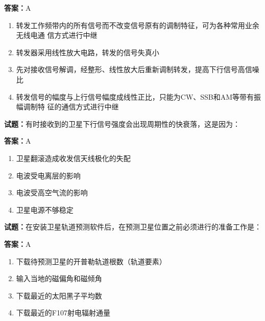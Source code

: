 \documentclass{ctexbook}
\begin{document}
\textbf{答案：}A 

\begin{enumerate}[leftmargin=3em]
  \item 转发工作频带内的所有信号而不改变信号原有的调制特征，可为各种常用业余无线电通
信方式进行中继 

  \item 转发器采用线性放大电路，转发的信号失真小 

  \item 先对接收信号解调，经整形、线性放大后重新调制转发，提高下行信号高信噪比 

  \item 转发信号的幅度与上行信号幅度成线性正比，只能为CW、SSB和AM等带有振幅调制特
征的通信方式进行中继 

\end{enumerate}





\vspace{1em}

\textbf{试题：}有时接收到的卫星下行信号强度会出现周期性的快衰落，这是因为： 

\textbf{答案：}A 

\begin{enumerate}[leftmargin=3em]
  \item 卫星翻滚造成收发信天线极化的失配 

  \item 电波受电离层的影响 

  \item 电波受高空气流的影响 

  \item 卫星电源不够稳定 

\end{enumerate}





\vspace{1em}

\textbf{试题：}在安装卫星轨道预测软件后，在预测卫星位置之前必须进行的准备工作是： 

\textbf{答案：}A 

\begin{enumerate}[leftmargin=3em]
  \item 下载待预测卫星的开普勒轨道根数（轨道要素） 

  \item 输入当地的磁偏角和磁倾角 

  \item 下载最近的太阳黑子平均数 

  \item 下载最近的F107射电辐射通量 

\end{enumerate}
\end{document}
